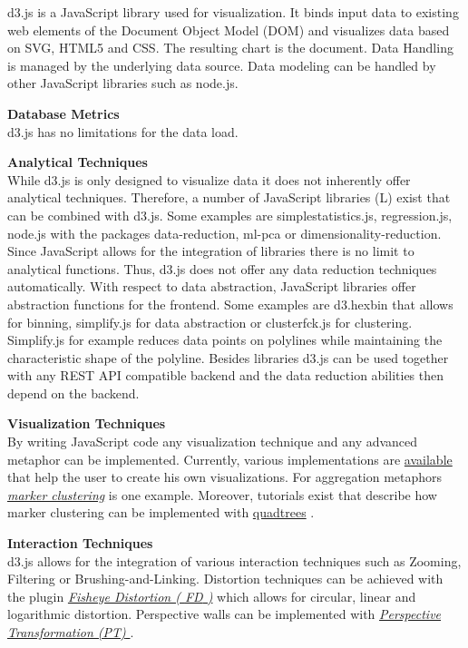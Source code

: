 d3.js is a JavaScript library used for visualization. It binds input data to existing web elements of the Document Object Model (\gls{DOM}) and visualizes data based on SVG, HTML5 and CSS. The resulting chart is the document. Data Handling is managed by the underlying data source. Data modeling can be handled by other JavaScript libraries such as node.js.
\par
\textbf{Database Metrics}\\
d3.js has no limitations for the data load.
\par
\textbf{Analytical Techniques}\\
While d3.js is only designed to visualize data it does not inherently offer analytical techniques. Therefore, a number of JavaScript libraries  (\gls{L}) exist that can be combined with d3.js. Some examples are simplestatistics.js, regression.js, node.js with the packages data-reduction, ml-pca or dimensionality-reduction. Since JavaScript allows for the integration of libraries there is no limit to analytical functions. Thus, d3.js does not offer any data reduction techniques automatically. 
With respect to data abstraction, JavaScript libraries offer abstraction functions for the frontend. Some examples are d3.hexbin that allows for binning, simplify.js for data abstraction or clusterfck.js for clustering. Simplify.js for example reduces data points on polylines while maintaining the characteristic shape of the polyline. Besides libraries d3.js can be used together with any REST API compatible backend and the data reduction abilities then depend on the backend.
\par

\textbf{Visualization Techniques}\\
By writing JavaScript code any visualization technique and any advanced metaphor can be implemented. Currently, various implementations are \href{https://github.com/d3/d3/wiki/Gallery}{available} that help the user to create his own visualizations. For aggregation metaphors \href{http://bl.ocks.org/gisminister/10001728}{\textit{marker clustering}} is one example. Moreover, tutorials exist that describe how marker clustering can be implemented with  \href{https://www.phase2technology.com/blog/using-d3-quadtrees-to-power-an-interactive-map-for-bonnier-corporation/}{quadtrees}  \cite{Morrison2014}.
\par

\textbf{Interaction Techniques}\\
d3.js allows for the integration of various interaction techniques such as Zooming, Filtering or Brushing-and-Linking. Distortion techniques can be achieved with the plugin \hyperlink{https://bost.ocks.org/mike/fisheye/}{\textit{Fisheye Distortion  ( \gls{FD}  )}}  \cite{Bostock2012} which allows for circular, linear and logarithmic distortion.
Perspective walls can be implemented with \hyperlink{https://bl.ocks.org/mbostock/10571478}{\textit{Perspective Transformation  (PT) }}  \cite{Bostock2017}.\\

